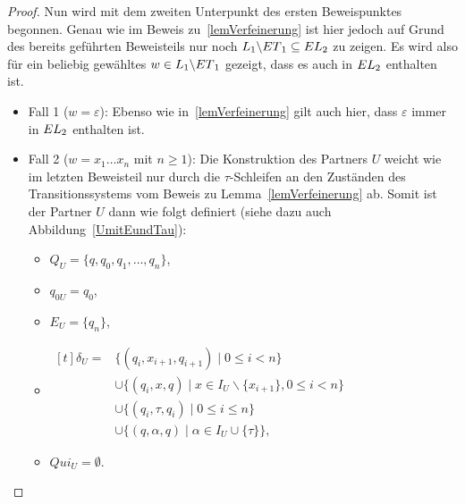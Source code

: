 \begin{proof}
  Nun wird mit dem zweiten Unterpunkt des ersten Beweispunktes begonnen. Genau
  wie im Beweis zu~\ref{lemVerfeinerung} ist hier jedoch auf Grund des bereits
  geführten Beweisteils nur noch $L_1\backslash ET{}_1\subseteq
  EL{}_2$ zu zeigen. Es wird also für ein beliebig gewähltes $w\in
  L_1\backslash ET{}_1$ gezeigt, dass es auch in $EL{}_2$ enthalten
  ist.
  \begin{itemize}
    \item Fall 1 ($w=\varepsilon$): Ebenso wie in~\ref{lemVerfeinerung} gilt
      auch hier, dass $\varepsilon$ immer in $EL{}_2$ enthalten ist.
    \item Fall 2 ($w=x_1\dots x_n$ mit $n\geq 1$): Die Konstruktion des
      Partners $U$ weicht wie im letzten Beweisteil nur durch die
      $\tau$-Schleifen an den Zuständen des Transitionssystems vom Beweis zu
      Lemma~\ref{lemVerfeinerung} ab. Somit ist der Partner $U$ dann wie folgt
      definiert (siehe dazu auch Abbildung~\ref{UmitEundTau}):
      \begin{itemize}
        \item $Q_U=\{q,q_0,q_1,\dots ,q_n\}$,
        \item $q_{0U}=q_0$,
        \item $E_U=\{q_n\}$,
        \item $\begin{aligned}[t]
            \delta _U=&\{(q_i,x_{i+1},q_{i+1})\mid 0\leq i< n\}\\
                      &\cup\{(q_i,x,q)\mid x\in I_U\backslash\{x_{i+1}\},0\leq
          i < n\}\\
          &\cup\{(q_i,\tau ,q_i)\mid 0\leq i\leq n\}\\
          &\cup\{(q,\alpha ,q)\mid \alpha\in I_U\cup \{\tau\}\},
              \end{aligned}$
        \item $Qui_U =\emptyset$.
      \end{itemize}
      \begin{figure} [h!tbp]
      \begin{center}
\end{center}
\end{figure}
\end{itemize}
\end{proof}
